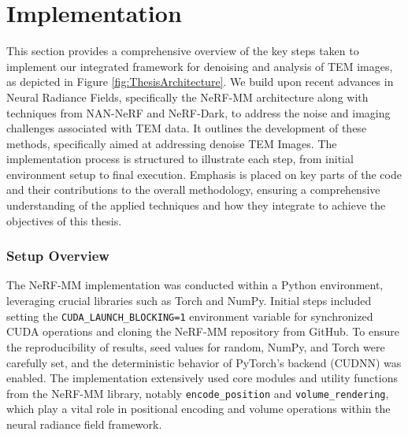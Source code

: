 \chapter{Implementation}\label{ch:Implementation}

This section provides a comprehensive overview of the key steps taken to implement our integrated framework for denoising and analysis of TEM images, as depicted in Figure \ref{fig:ThesisArchitecture}. We build upon recent advances in Neural Radiance Fields, specifically the NeRF-MM architecture along with techniques from NAN-NeRF and NeRF-Dark, to address the noise and imaging challenges associated with TEM data. It outlines the development of these methods, specifically aimed at addressing denoise TEM Images. The implementation process is structured to illustrate each step, from initial environment setup to final execution. Emphasis is placed on key parts of the code and their contributions to the overall methodology, ensuring a comprehensive understanding of the applied techniques and how they integrate to achieve the objectives of this thesis.


\subsection{Setup Overview}
The NeRF-MM implementation was conducted within a Python environment, leveraging crucial libraries such as Torch and NumPy. Initial steps included setting the \texttt{CUDA\_LAUNCH\_BLOCKING=1} environment variable for synchronized CUDA operations and cloning the NeRF-MM repository from GitHub. To ensure the reproducibility of results, seed values for random, NumPy, and Torch were carefully set, and the deterministic behavior of PyTorch's backend (CUDNN) was enabled. The implementation extensively used core modules and utility functions from the NeRF-MM library, notably \texttt{encode\_position} and \texttt{volume\_rendering}, which play a vital role in positional encoding and volume operations within the neural radiance field framework.

